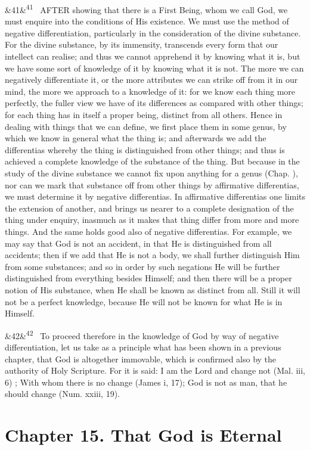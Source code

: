 \documentclass[12pt]{article}
\newcommand{\para}[1][]{\par\noindent\ifx&#1&\else\textsuperscript{\footnotesize #1}~\fi}
\begin{document}
\para[41] AFTER showing that there is a First Being, whom we call God, we must enquire into the conditions of His existence. We must use the method of negative differentiation, particularly in the consideration of the divine substance. For the divine substance, by its immensity, transcends every form that our intellect can realise; and thus we cannot apprehend it by knowing what it is, but we have some sort of knowledge of it by knowing what it is not. The more we can negatively differentiate it, or the more attributes we can strike off from it in our mind, the more we approach to a knowledge of it: for we know each thing more perfectly, the fuller view we have of its differences as compared with other things; for each thing has in itself a proper being, distinct from all others. Hence in dealing with things that we can define, we first place them in some genus, by which we know in general what the thing is; and afterwards we add the differentias whereby the thing is distinguished from other things; and thus is achieved a complete knowledge of the substance of the thing. But because in the study of the divine substance we cannot fix upon anything for a genus (Chap. ), nor can we mark that substance off from other things by affirmative differentias, we must determine it by negative differentias. In affirmative differentias one limits the extension of another, and brings us nearer to a complete designation of the thing under enquiry, inasmuch as it makes that thing differ from more and more things. And the same holds good also of negative differentias. For example, we may say that God is not an accident, in that He is distinguished from all accidents; then if we add that He is not a body, we shall further distinguish Him from some substances; and so in order by such negations He will be further distinguished from everything besides Himself; and then there will be a proper notion of His substance, when He shall be known as distinct from all. Still it will not be a perfect knowledge, because He will not be known for what He is in Himself.

\para[42] To proceed therefore in the knowledge of God by way of negative differentiation, let us take as a principle what has been shown in a previous chapter, that God is altogether immovable, which is confirmed also by the authority of Holy Scripture. For it is said: I am the Lord and change not (Mal. iii, 6) ; With whom there is no change (James i, 17); God is not as man, that he should change (Num. xxiii, 19).

\section*{Chapter 15. That God is Eternal}
\end{document}

